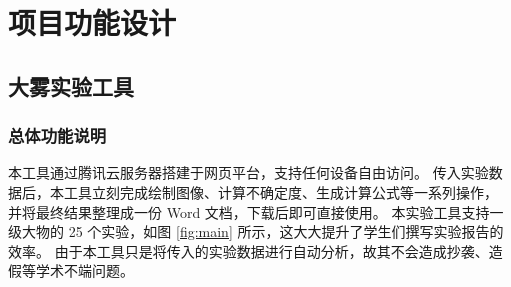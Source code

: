 \section{项目功能设计}

\subsection{大雾实验工具}

\subsubsection{总体功能说明}

本工具通过腾讯云服务器搭建于网页平台，支持任何设备自由访问。
传入实验数据后，本工具立刻完成绘制图像、计算不确定度、生成计算公式等一系列操作，
并将最终结果整理成一份 Word 文档，下载后即可直接使用。
本实验工具支持一级大物的 25 个实验，如图 \ref{fig:main} 所示，这大大提升了学生们撰写实验报告的效率。
由于本工具只是将传入的实验数据进行自动分析，故其不会造成抄袭、造假等学术不端问题。

